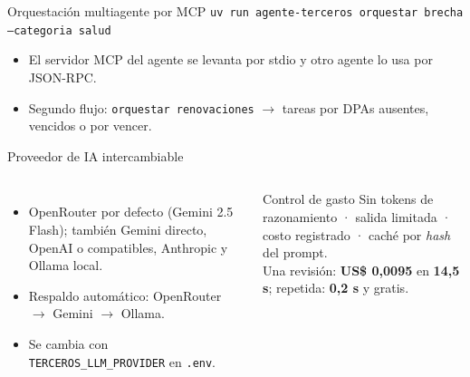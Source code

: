 \documentclass[aspectratio=169,10pt]{beamer}
\begin{document}
\begin{frame}[fragile]{Orquestación multiagente por MCP}
\small
\texttt{uv run agente-terceros orquestar brecha --categoria salud}
\begin{center}
\end{center}
\begin{itemize}
  \item El servidor MCP del agente se levanta por stdio y otro agente lo usa por JSON-RPC.
  \item Segundo flujo: \texttt{orquestar renovaciones} $\rightarrow$ tareas por DPAs ausentes, vencidos o por vencer.
\end{itemize}
\end{frame}

\begin{frame}{Proveedor de IA intercambiable}
\begin{columns}[T]
\small
\begin{itemize}
  \item \alert{OpenRouter} por defecto (Gemini 2.5 Flash); también Gemini directo, OpenAI o compatibles, Anthropic y Ollama local.
  \item \alert{Respaldo automático}: OpenRouter $\rightarrow$ Gemini $\rightarrow$ Ollama.
  \item Se cambia con \texttt{TERCEROS\_LLM\_PROVIDER} en \texttt{.env}.
\end{itemize}
\begin{block}{Control de gasto}
\small
Sin tokens de razonamiento · salida limitada · costo registrado · caché por \emph{hash} del prompt.\\[4pt]
Una revisión: \textbf{US\$ 0{,}0095} en \textbf{14,5 s}; repetida: \textbf{0,2 s} y gratis.
\end{block}
\end{columns}
\end{frame}
\end{document}
